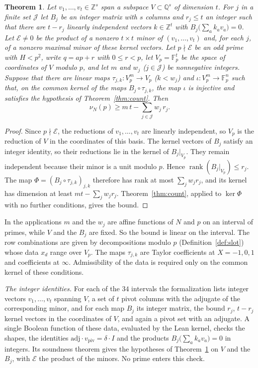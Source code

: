 \documentclass[11pt]{amsart}
\newtheorem{theorem}{Theorem}[section]
\theoremstyle{definition}
\theoremstyle{remark}
\numberwithin{equation}{section}
\newcommand{\Z}{\mathbb Z}
\newcommand{\Q}{\mathbb Q}
\newcommand{\F}{\mathbb F}
\begin{document}
\begin{theorem}\label{thm:profile}
Let $v_1,\dots,v_t\in\Z^s$ span a subspace $V\subset\Q^s$ of dimension $t$. For $j$ in a finite set $\mathcal J$
let $B_j$ be an integer matrix with $s$ columns and $r_j\le t$ an integer such that there are $t-r_j$ linearly
independent vectors $k\in\Z^t$ with $B_j\bigl(\sum_ak_av_a\bigr)=0$. Let $\mathcal E\ne0$ be the product of a
nonzero $t\times t$ minor of $(v_1,\dots,v_t)$ and, for each $j$, of a nonzero maximal minor of these kernel
vectors. Let $p\nmid\mathcal E$ be an odd prime with $H<p^2$, write $q=ap+r$ with $0\le r<p$, let $V_p=\F_p^t$ be
the space of coordinates of $V$ modulo $p$, and let $m$ and $w_j$ ($j\in\mathcal J$) be nonnegative integers.
Suppose that there are linear maps $\tau_{j,k}\colon V_p^m\to V_p$ ($k<w_j$) and $\iota\colon V_p^m\to\F_p^n$ such
that, on the common kernel of the maps $B_j\circ\tau_{j,k}$, the map $\iota$ is injective and satisfies the
hypothesis of Theorem~\ref{thm:count}. Then
\[
 \nu_N(p)\ge m\,t-\sum_{j\in\mathcal J}w_j\,r_j .
\]
\end{theorem}

\begin{proof}
Since $p\nmid\mathcal E$, the reductions of $v_1,\dots,v_t$ are linearly independent, so $V_p$ is the
reduction of $V$ in the coordinates of this basis. The kernel vectors of $B_j$ satisfy an integer identity,
so their reductions lie in the kernel of $B_j|_{V_p}$. They remain independent because their minor is a unit
modulo $p$. Hence $\operatorname{rank}(B_j|_{V_p})\le r_j$. The map $\Phi=(B_j\circ\tau_{j,k})_{j,k}$ therefore
has rank at most $\sum_jw_jr_j$, and its kernel has dimension at least $mt-\sum_jw_jr_j$.
Theorem~\ref{thm:count}, applied to $\ker\Phi$ with no further conditions, gives the bound.
\end{proof}

In the applications $m$ and the $w_j$ are affine functions of $N$ and $p$ on an interval of primes, while $V$
and the $B_j$ are fixed. So the bound is linear on the interval. The row combinations are given by
decompositions modulo $p$ (Definition~\ref{def:slot}) whose data $x_d$ range over $V_p$. The maps $\tau_{j,k}$
are Taylor coefficients at $X=-1,0,1$ and coefficients at $\infty$. Admissibility of the data is required only
on the common kernel of these conditions.

\emph{The integer identities.} For each of the $34$ intervals the formalization lists integer vectors
$v_1,\dots,v_t$ spanning $V$, a set of $t$ pivot columns with the adjugate of the corresponding minor, and for
each map $B_j$ its integer matrix, the bound $r_j$, $t-r_j$ kernel vectors in the coordinates of $V$, and again
a pivot set with an adjugate. A single Boolean function of these data, evaluated by the Lean kernel, checks
the shapes, the identities $\mathrm{adj}\cdot v_{\mathrm{piv}}=\delta\cdot I$ and the products
$B_j\bigl(\sum_ak_av_a\bigr)=0$ in integers. Its soundness theorem gives the hypotheses of
Theorem~\ref{thm:profile} on $V$ and the $B_j$, with $\mathcal E$ the product of the minors. No prime enters this
check.
\end{document}
